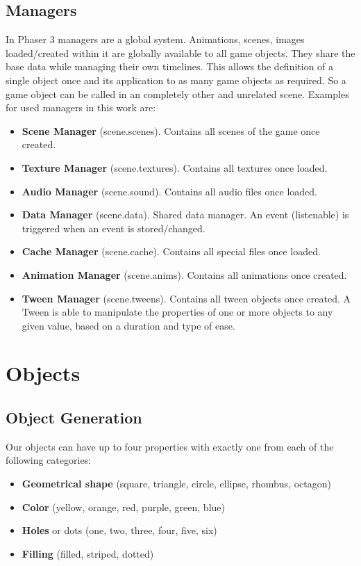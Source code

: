 \subsection{Managers}\label{subsec:managers}
In Phaser 3 managers are a global system.
Animations, scenes, images loaded/created within it are globally available to all game objects.
They share the base data while managing their own timelines.
This allows the definition of a single object once and its application to as many game objects as required.
So a game object can be called in an completely other and unrelated scene.
Examples for used managers in this work are:

\begin{itemize}
    \item \textbf{Scene Manager} (scene.scenes). Contains all scenes of the game once created.
    \item \textbf{Texture Manager} (scene.textures). Contains all textures once loaded.
    \item \textbf{Audio Manager} (scene.sound). Contains all audio files once loaded.
    \item \textbf{Data Manager} (scene.data). Shared data manager.
    An event (listenable) is triggered when an event is stored/changed.
    \item \textbf{Cache Manager} (scene.cache). Contains all special files once loaded.
    \item \textbf{Animation Manager} (scene.anims). Contains all animations once created.
    \item \textbf{Tween Manager} (scene.tweens). Contains all tween objects once created.
    A Tween is able to manipulate the properties of one or more objects to any given value, based
    on a duration and type of ease.
\end{itemize}

\section{Objects}\label{sec:objects}
\subsection{Object Generation}\label{subsec:object-generation}
Our objects can have up to four properties with exactly one from each of the following categories:

\begin{itemize}
    \item \textbf{Geometrical shape} (square, triangle, circle, ellipse, rhombus, octagon)
    \item \textbf{Color} (yellow, orange, red, purple, green, blue)
    \item \textbf{Holes} or dots (one, two, three, four, five, six)
    \item \textbf{Filling} (filled, striped, dotted)
\end{itemize}

